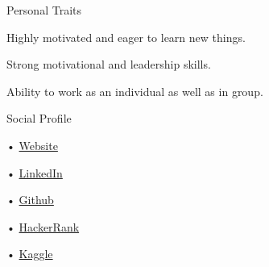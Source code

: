\documentclass{resume} %
\begin{document}
\begin{rSection}{Personal Traits}
\item Highly motivated and eager to learn new things.
\item Strong motivational and leadership skills.
\item Ability to work as an individual as well as in group.
\end{rSection}

\begin{rSection}{Social Profile}
\item[•] \href{https://imsazzad.github.io/}{Website}
\item[•] \href{https://www.linkedin.com/in/md-abdul-hasib-sazzad-19b88099/}{LinkedIn}
\item[•] \href{https://github.com/imsazzad/}{Github}
\item[•] \href{https://www.hackerrank.com/SazzadBuet08}{HackerRank}
\item[•] \href{https://www.kaggle.com/sazzadabdulhasib}{Kaggle}
\end{rSection}
\end{document}
